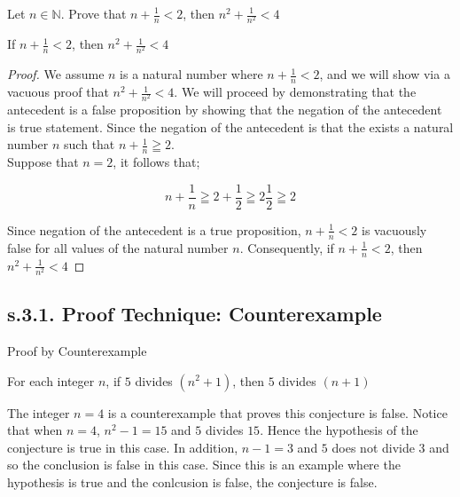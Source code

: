 \begin{example}
Let $n \in \mathbb{N}$. Prove that $n + \frac{1}{n} < 2$, then $n^2 + \frac{1}{n^2} < 4$

\begin{tcolorbox}
	\begin{theorem}
		If $n + \frac{1}{n} < 2$, then $n^2 + \frac{1}{n^2} < 4$
	\end{theorem}
\end{tcolorbox}

\begin{proof}
We assume $n$ is a natural number where $n + \frac{1}{n} < 2$, and we will show via a vacuous proof that $n^2 + \frac{1}{n^2} < 4$. We will proceed by demonstrating that the antecedent is a false proposition by showing that the negation of the antecedent is true statement. Since the negation of the antecedent is that the exists a natural number $n$ such that $n + \frac{1}{n} \geqq 2$. \\ 
Suppose that $n = 2$, it follows that; 

	\begin{equation}
		n + \frac{1}{n} \geqq 2 + \frac{1}{2} \geqq 2\frac{1}{2} \geqq 2 \nonumber 
	\end{equation}

Since negation of the antecedent is a true proposition, $n + \frac{1}{n} < 2$ is vacuously false for all values of the natural number $n$. Consequently, if $n + \frac{1}{n} < 2$, then $n^2 + \frac{1}{n^2} < 4$
\end{proof}
\end{example}








\newpage
\subsection{s.3.1. Proof Technique: Counterexample}

\begin{example}
Proof by Counterexample

\begin{tcolorbox}
	\begin{conjecture}
		For each integer $n$, if $5$ divides $(n^2 + 1 )$, then $5$ divides $(n + 1)$
	\end{conjecture}
\end{tcolorbox}

The integer $n = 4$ is a counterexample that proves this conjecture is false. Notice that when $n=4$, $n^2 - 1 = 15$ and $5$ divides $15$. Hence the hypothesis of the conjecture is true in this case. In addition, $n - 1 = 3$ and $5$ does not divide $3$ and so the conclusion is false in this case. Since this is an example where the hypothesis is true and the conlcusion is false, the conjecture is false. 
\end{example}





